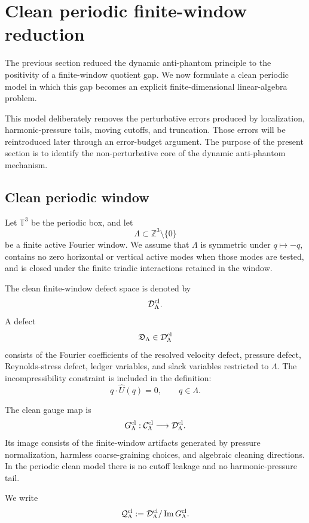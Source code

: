 \documentclass[11pt]{article}
\numberwithin{equation}{section}
\begin{document}
\section{Clean periodic finite-window reduction}\label{sec:clean-periodic-reduction}

The previous section reduced the dynamic anti-phantom principle to the
positivity of a finite-window quotient gap.  We now formulate a clean
periodic model in which this gap becomes an explicit finite-dimensional
linear-algebra problem.

This model deliberately removes the perturbative errors produced by
localization, harmonic-pressure tails, moving cutoffs, and truncation.
Those errors will be reintroduced later through an error-budget argument.
The purpose of the present section is to identify the non-perturbative
core of the dynamic anti-phantom mechanism.

\subsection{Clean periodic window}

Let \(\mathbb T^3\) be the periodic box, and let
\[
        \Lambda\subset \mathbb Z^3\setminus\{0\}
\]
be a finite active Fourier window.  We assume that \(\Lambda\) is
symmetric under \(q\mapsto -q\), contains no zero horizontal or vertical
active modes when those modes are tested, and is closed under the finite
triadic interactions retained in the window.

The clean finite-window defect space is denoted by
\[
        \mathcal D_\Lambda^{\rm cl}.
\]
A defect
\[
        \mathfrak D_\Lambda\in\mathcal D_\Lambda^{\rm cl}
\]
consists of the Fourier coefficients of the resolved velocity defect,
pressure defect, Reynolds-stress defect, ledger variables, and slack
variables restricted to \(\Lambda\).  The incompressibility constraint is
included in the definition:
\[
        q\cdot \widehat U(q)=0,
        \qquad q\in\Lambda.
\]

The clean gauge map is
\[
        G_\Lambda^{\rm cl}:
        \mathcal C_\Lambda^{\rm cl}
        \longrightarrow
        \mathcal D_\Lambda^{\rm cl}.
\]
Its image consists of the finite-window artifacts generated by pressure
normalization, harmless coarse-graining choices, and algebraic cleaning
directions.  In the periodic clean model there is no cutoff leakage and no
harmonic-pressure tail.

We write
\[
        \mathcal Q_\Lambda^{\rm cl}
        :=
        \mathcal D_\Lambda^{\rm cl}/\operatorname{Im}G_\Lambda^{\rm cl}.
\]
\end{document}
